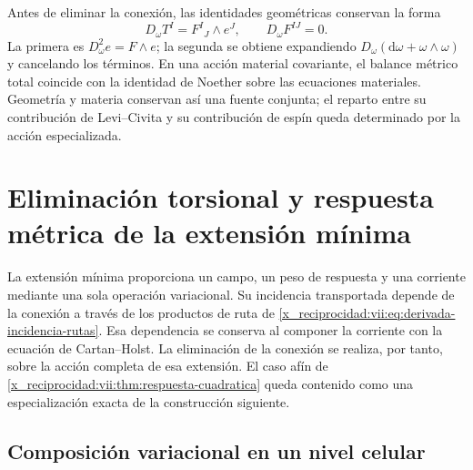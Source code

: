 \begin{HMTCompactSection}
Antes de eliminar la conexión, las identidades geométricas conservan
la forma
\begin{equation}
 D_\omega T^I=F^I{}_{J}\wedge e^J,\qquad D_\omega F^{IJ}=0.
 \label{x_reciprocidad:vii:eq:bianchi-cartan}
\end{equation}
La primera es \(D_\omega^2e=F\wedge e\); la segunda se obtiene
expandiendo \(D_\omega(\mathrm d\omega+\omega\wedge\omega)\)
y cancelando los términos. En una acción material covariante, el
balance métrico total coincide con la identidad de Noether sobre las
ecuaciones materiales. Geometría y materia conservan así una fuente
conjunta; el reparto entre su contribución de Levi--Civita y su
contribución de espín queda determinado por la acción especializada.


\end{HMTCompactSection}


\chapter{Eliminación torsional y respuesta métrica de la extensión mínima}
\label{x_reciprocidad:vii:sec:eliminacion-torsional-no-lineal}

La extensión mínima proporciona un campo, un peso de respuesta y una
corriente mediante una sola operación variacional. Su incidencia
transportada depende de la conexión a través de los productos de ruta de
\eqref{x_reciprocidad:vii:eq:derivada-incidencia-rutas}. Esa dependencia se conserva al
componer la corriente con la ecuación de Cartan--Holst. La eliminación
de la conexión se realiza, por tanto, sobre la acción completa de esa
extensión. El caso afín de
\ref{x_reciprocidad:vii:thm:respuesta-cuadratica} queda contenido como una
especialización exacta de la construcción siguiente.

\section{Composición variacional en un nivel celular}
\label{x_reciprocidad:vii:subsec:composicion-torsional-celular}

